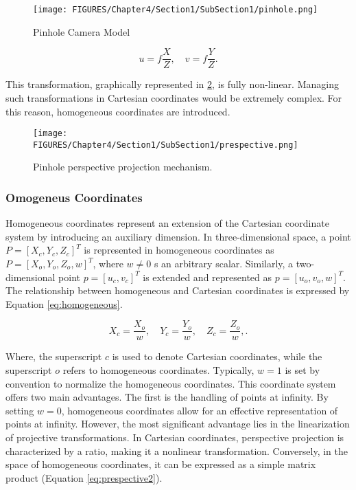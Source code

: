 \begin{figure}[htbp]
  \centering
  \texttt{[image: FIGURES/Chapter4/Section1/SubSection1/pinhole.png]}
  \caption{Pinhole Camera Model} 
  \label{fig:pinhole}  
\end{figure}


\begin{equation}
    u = f \frac{X}{Z}, \quad v = f \frac{Y}{Z}.
    \label{eq:prespective1}
\end{equation}

This transformation, graphically represented in \ref{fig:prespective1}, is fully non-linear. Managing such transformations in Cartesian coordinates would be extremely complex. For this reason, homogeneous coordinates are introduced.

\begin{figure}[htbp]
  \centering
  \texttt{[image: FIGURES/Chapter4/Section1/SubSection1/prespective.png]}
  \caption{Pinhole perspective projection mechanism.} 
  \label{fig:prespective1}  
\end{figure}

\subsubsection{Omogeneus Coordinates}

Homogeneous coordinates represent an extension of the Cartesian coordinate system by introducing an auxiliary dimension.
In three-dimensional space, a point $P = [X_c, Y_c, Z_c]^T$ is represented in homogeneous coordinates as $P = [X_o, Y_o, Z_o, w]^T$, where  $w \neq  0$ s an arbitrary scalar. Similarly, a two-dimensional point $p = [u_c, v_c]^T$ is extended and represented as $p = [u_o, v_o, w]^T$.
The relationship between homogeneous and Cartesian coordinates is expressed by Equation \ref{eq:homogeneous}.

\begin{equation}
  X_c = \frac{X_o}{w}, \quad Y_c = \frac{Y_o}{w}, \quad Z_c = \frac{Z_o}{w},.
  \label{eq:homogeneous}
\end{equation}

Where, the superscript $c$ is used to denote Cartesian coordinates, while the superscript $o$ refers to homogeneous coordinates. Typically, $w=1$ is set by convention to normalize the homogeneous coordinates.
This coordinate system offers two main advantages. The first is the handling of points at infinity. By setting $w = 0$, homogeneous coordinates allow for an effective representation of points at infinity. However, the most significant advantage lies in the linearization of projective transformations.
In Cartesian coordinates, perspective projection is characterized by a ratio, making it a nonlinear transformation. Conversely, in the space of homogeneous coordinates, it can be expressed as a simple matrix product (Equation \ref{eq:prespective2}).


